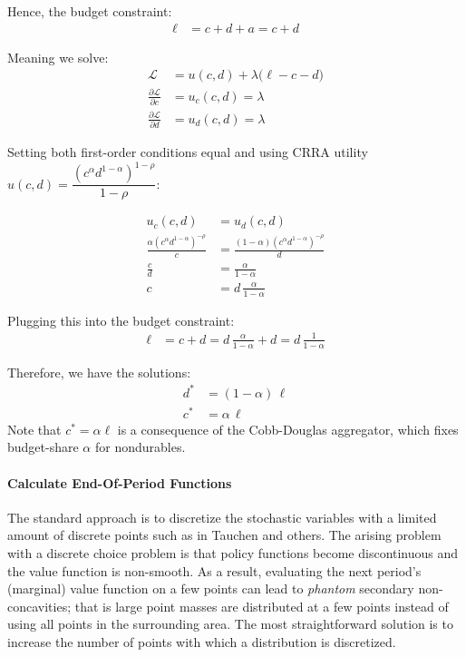 Hence, the budget constraint:
\begin{align}
	\ell &= c + d + a = c + d
\end{align}

Meaning we solve:
\begin{align}
	\mathscr{L} &= u(c,d) + \lambda\bigl(\ell - c - d\bigr)\\
	\frac{\partial \mathscr{L}}{\partial c} &= u_c(c,d) = \lambda\\
	\frac{\partial \mathscr{L}}{\partial d} &= u_d(c,d) = \lambda
\end{align}

Setting both first-order conditions equal and using CRRA utility $u(c,d) = \dfrac{(c^{\alpha} d^{1-\alpha})^{1-\rho}}{1-\rho}$:

\begin{align}
	u_c(c,d) &= u_d(c,d) \\
	\frac{\alpha (c^\alpha d^{1-\alpha})^{-\rho}}{c} &= \frac{(1-\alpha)(c^\alpha d^{1-\alpha})^{-\rho}}{d} \\
	\frac{c}{d} &= \frac{\alpha}{1-\alpha}\\
	c &= d\,\frac{\alpha}{1-\alpha}
\end{align}

Plugging this into the budget constraint:
\begin{align}
	\ell &= c + d = d\,\frac{\alpha}{1-\alpha} + d = d\,\frac{1}{1-\alpha}
\end{align}

Therefore, we have the solutions:
\begin{align}
	d^{*} &= (1-\alpha)\,\ell \\
	c^{*} &= \alpha\,\ell
\end{align}
Note that $c^* = \alpha\ell$ is a consequence of the Cobb-Douglas aggregator, which fixes budget-share $\alpha$ for nondurables.


\paragraph{Calculate End-Of-Period Functions}

The standard approach is to discretize the stochastic variables with a limited amount of discrete points such as in Tauchen and others. The arising problem with a discrete choice problem is that policy functions become discontinuous and the value function is non-smooth. As a result, evaluating the next period's (marginal) value function on a few points can lead to \textit{phantom} secondary non-concavities; that is large point masses are distributed at a few points instead of using all points in the surrounding area. The most straightforward solution is to increase the number of points with which a distribution is discretized.

